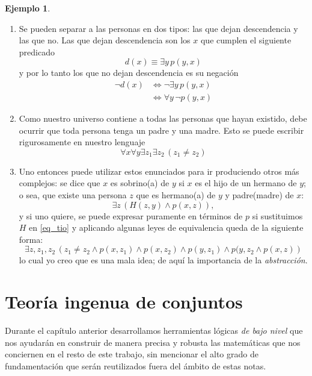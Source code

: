 \documentclass{book}
\theoremstyle{definition}
\newtheorem{ejm}{Ejemplo}[chapter]
\begin{document}
\begin{ejm}
\begin{enumerate}
		\item Se pueden separar a las personas en dos tipos: las que dejan descendencia y las que no.
		Las que dejan descendencia son los $x$ que cumplen el siguiente predicado
		\[d(x)\equiv \exists y\, p(y,x) \]
		y por lo tanto los que no dejan descendencia es su negación
		\begin{align*}
			\neg d(x) 
			& \iff \neg \exists y\, p(y,x)\\
			& \iff \forall y\, \neg p(y,x)
		\end{align*}
		\item Como nuestro universo contiene a todas las personas que hayan existido, debe ocurrir que toda persona tenga un padre y una madre. Esto se puede escribir rigurosamente en nuestro lenguaje  %
		\[\forall x \forall y \exists z_1 \exists z_2 \, \left(z_1 \neq z_2 \right) \]
		\item Uno entonces puede utilizar estos enunciados para ir produciendo otros más complejos: se dice que $x$ es sobrino(a) de $y$ si $x$ es el hijo de un hermano de $y$; o sea, que existe una persona $z$ que es hermano(a) de $y$ y padre(madre) de $x$:
		\begin{equation}\label{eq_tio}
			\exists z \, \left(H(z,y) \wedge p(x,z) \right),
		\end{equation}
		y si uno quiere, se puede expresar puramente en términos de $p$ si sustituimos $H$ en \ref{eq_tio} y aplicando algunas leyes de equivalencia queda de la siguiente forma:
		\begin{equation*}
			\exists z,z_1,z_2 \,
			\left( 
				z_1 \neq z_2 \wedge 
				p(x,z_1) \wedge 
				p(x,z_2) \wedge 
				p(y,z_1) \wedge 
				p(y,z_2	\wedge 
				p(x,z)
			\right)
		\end{equation*}
		lo cual yo creo que es una mala idea; de aquí la importancia de la \emph{abstracción}.
	\end{enumerate}
\end{ejm}

\chapter{Teoría ingenua de conjuntos}
Durante el capítulo anterior desarrollamos herramientas lógicas \emph{de bajo nivel} que nos ayudarán en construir de manera precisa y robusta las matemáticas que nos conciernen en el resto de este trabajo, sin mencionar el alto grado de fundamentación que serán reutilizados fuera del ámbito de estas notas.
\end{document}

